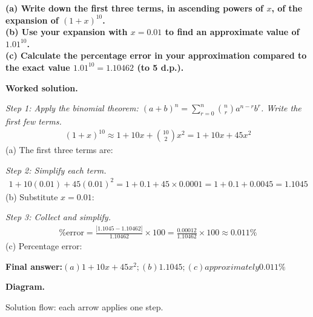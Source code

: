 \documentclass[11pt]{article}
\newcommand{\question}[1]{\par\medskip\noindent\textbf{#1}\par}
\begin{document}
\question{(a) Write down the first three terms, in ascending powers of \( x \), of the expansion of \( (1 + x)^{10} \). \\[3pt] (b) Use your expansion with \( x = 0.01 \) to find an approximate value of \( 1.01^{10} \). \\[3pt] (c) Calculate the percentage error in your approximation compared to the exact value \( 1.01^{10} = 1.10462 \) (to 5 d.p.).}

\textbf{Worked solution.}

\textit{Step 1: Apply the binomial theorem: \((a+b)^n = \sum_{r=0}^{n} \binom{n}{r} a^{n-r} b^r\). Write the first few terms.}
\[\begin{gathered}
(1+x)^{10} \approx 1 + 10x + \binom{10}{2}x^2 = 1 + 10x + 45x^2
\end{gathered}\]
(a) The first three terms are:

\textit{Step 2: Simplify each term.}
\[\begin{gathered}
1 + 10(0.01) + 45(0.01)^2 = 1 + 0.1 + 45 \times 0.0001 = 1 + 0.1 + 0.0045 = 1.1045
\end{gathered}\]
(b) Substitute \(x = 0.01\):

\textit{Step 3: Collect and simplify.}
\[\begin{gathered}
\text{\% error} = \frac{|1.1045 - 1.10462|}{1.10462} \times 100 = \frac{0.00012}{1.10462} \times 100 \approx 0.011\%
\end{gathered}\]
(c) Percentage error:

\begin{answerbox}
\textbf{Final answer:}\quad \(\displaystyle (a) 1 + 10x + 45x^2; (b) 1.1045; (c) approximately 0.011\%\)
\end{answerbox}
\textbf{Diagram.}

\begin{center}
\end{center}
\small Solution flow: each arrow applies one step.\normalsize
\end{document}
